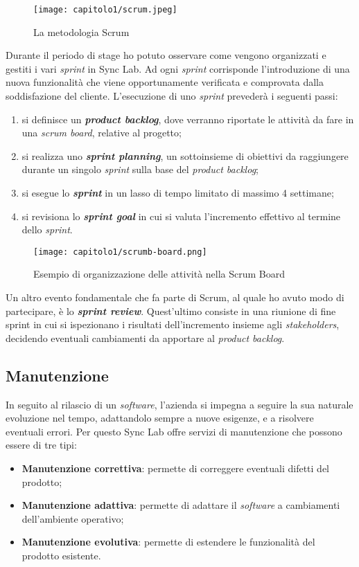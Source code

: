 \clearpage

\begin{figure}[h!]
  \centering
  \texttt{[image: capitolo1/scrum.jpeg]}
  \caption{La metodologia Scrum}
\end{figure}

Durante il periodo di stage ho potuto osservare come vengono organizzati e gestiti i vari \textit{sprint} in Sync Lab. Ad ogni \textit{sprint} corrisponde l'introduzione di una nuova funzionalità che viene opportunamente verificata e comprovata dalla soddisfazione del cliente. L'esecuzione di uno \textit{sprint} prevederà i seguenti passi:
\begin{enumerate}
  \item si definisce un \textbf{\textit{product backlog}}, dove verranno riportate le attività da fare in una \textit{scrum board}, relative al progetto;
  \item si realizza uno \textbf{\textit{sprint planning}}, un sottoinsieme di obiettivi da raggiungere durante un singolo \textit{sprint} sulla base del \textit{product backlog};
  \item si esegue lo \textbf{\textit{sprint}} in un lasso di tempo limitato di massimo 4 settimane;
  \item si revisiona lo \textbf{\textit{sprint goal}} in cui si valuta l'incremento effettivo al termine dello \textit{sprint}.
\end{enumerate}


\begin{figure}[h!]
  \centering
  \texttt{[image: capitolo1/scrumb-board.png]}
  \caption{Esempio di organizzazione delle attività nella Scrum Board}
\end{figure}

Un altro evento fondamentale che fa parte di Scrum, al quale ho avuto modo di partecipare, è lo \textbf{\textit{sprint review}}. Quest'ultimo consiste in una riunione di fine sprint in cui si ispezionano i risultati dell'incremento insieme agli \textit{stakeholders}, decidendo eventuali cambiamenti da apportare al \textit{product backlog}. \\

\subsection{Manutenzione}
In seguito al rilascio di un \textit{software}, l'azienda si impegna a seguire la sua naturale evoluzione nel tempo, adattandolo sempre a nuove esigenze, e a risolvere eventuali errori. Per questo Sync Lab offre servizi di manutenzione che possono essere di tre tipi:
\begin{itemize}
  \item \textbf{Manutenzione correttiva}: permette di correggere eventuali difetti del prodotto;
  \item \textbf{Manutenzione adattiva}: permette di adattare il \textit{software} a cambiamenti dell'ambiente operativo;
  \item \textbf{Manutenzione evolutiva}: permette di estendere le funzionalità del prodotto esistente.
\end{itemize}

